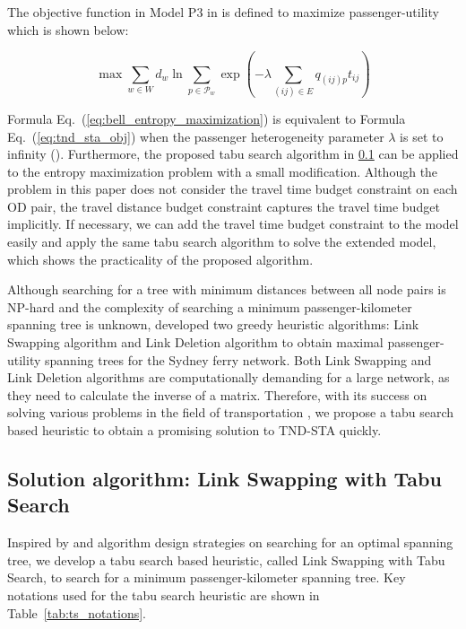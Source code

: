 \documentclass[10pt,english]{article}
\renewcommand{\eqref}[1]{Eq.~(\ref{#1})}
\newcommand{\tabref}[1]{Table~\ref{#1}}
\begin{document}
The objective function in Model P3 in \citet{Bell2020} is defined to maximize passenger-utility which is shown below:

\begin{equation}\label{eq:bell_entropy_maximization}
\max{\sum_{w\in W}{d_w\ln{\sum_{p\in\mathcal{P}_w}\exp{\left(-\lambda\sum_{\left(ij\right)\in E}{q_{\left(ij\right)p}t_{ij}}\right)}}}}
\end{equation}

Formula \eqref{eq:bell_entropy_maximization} is equivalent to Formula \eqref{eq:tnd_sta_obj} when the passenger heterogeneity parameter $\lambda$ is set to infinity (\citet{Bell2020}). Furthermore, the proposed tabu search algorithm in \ref{sec:ts_algorithm} can be applied to the entropy maximization problem with a small modification. Although the problem in this paper does not consider the travel time budget constraint on each OD pair, the travel distance budget constraint captures the travel time budget implicitly. If necessary, we can add the travel time budget constraint to the model easily and apply the same tabu search algorithm to solve the extended model, which shows the practicality of the proposed algorithm.

Although searching for a tree with minimum distances between all node pairs is NP-hard \citep{Garey1979} and the complexity of searching a minimum passenger-kilometer spanning tree is unknown, \citet{Bell2020} developed two greedy heuristic algorithms: Link Swapping algorithm and Link Deletion algorithm to obtain maximal passenger-utility spanning trees for the Sydney ferry network. Both Link Swapping and Link Deletion algorithms are computationally demanding for a large network, as they need to calculate the inverse of a matrix. Therefore, with its success on solving various problems in the field of transportation \citep{Chen2022, Hu2018, Xiao2018, Xu2022, Xue2021}, we propose a tabu search based heuristic to obtain a promising solution to TND-STA quickly.


\subsection{Solution algorithm: Link Swapping with Tabu Search}\label{sec:ts_algorithm}

Inspired by \citet{Oncan2008} and \citet{Rothlauf2009} algorithm design strategies on searching for an optimal spanning tree, we develop a tabu search based heuristic, called Link Swapping with Tabu Search, to search for a minimum passenger-kilometer spanning tree. Key notations used for the tabu search heuristic are shown in \tabref{tab:ts_notations}.
\end{document}
